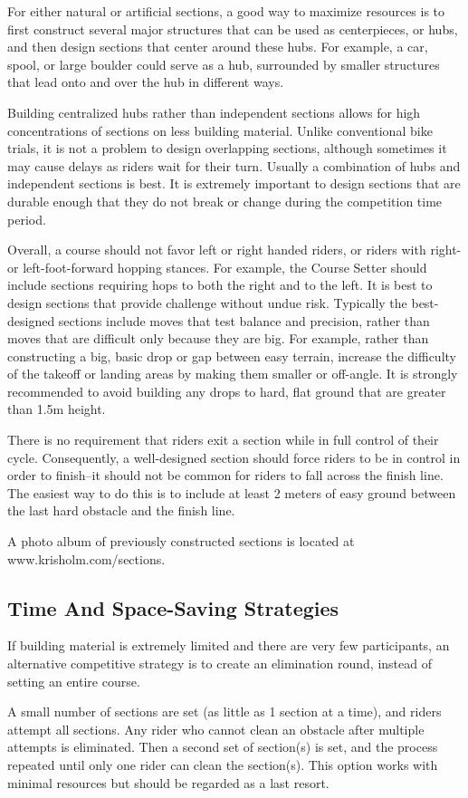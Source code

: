 For either natural or artificial sections, a good way to maximize resources is to first construct several major structures that can be used as centerpieces, or hubs, and then design sections that center around these hubs. 
For example, a car, spool, or large boulder could serve as a hub, surrounded by smaller structures that lead onto and over the hub in different ways.

Building centralized hubs rather than independent sections allows for high concentrations of sections on less building material.
Unlike conventional bike trials, it is not a problem to design overlapping sections, although sometimes it may cause delays as riders wait for their turn. 
Usually a combination of hubs and independent sections is best.
It is extremely important to design sections that are durable enough that they do not break or change during the competition time period.

Overall, a course should not favor left or right handed riders, or riders with right- or left-foot-forward hopping stances.
For example, the Course Setter should include sections requiring hops to both the right and to the left.
It is best to design sections that provide challenge without undue risk. 
Typically the best-designed sections include moves that test balance and precision, rather than moves that are difficult only because they are big. 
For example, rather than constructing a big, basic drop or gap between easy terrain, increase the difficulty of the takeoff or landing areas by making them smaller or off-angle. 
It is strongly recommended to avoid building any drops to hard, flat ground that are greater than 1.5m height.

There is no requirement that riders exit a section while in full control of their cycle. 
Consequently, a well-designed section should force riders to be in control in order to finish--it should not be common for riders to fall across the finish line. 
The easiest way to do this is to include at least 2 meters of easy ground between the last hard obstacle and the finish line.

A photo album of previously constructed sections is located at www.krisholm.com/sections.

\subsection{Time And Space-Saving Strategies}
If building material is extremely limited and there are very few participants, an alternative competitive strategy is to create an elimination round, instead of setting an entire course.

A small number of sections are set (as little as 1 section at a time), and riders attempt all sections. 
Any rider who cannot clean an obstacle after multiple attempts is eliminated. 
Then a second set of section(s) is set, and the process repeated until only one rider can clean the section(s). 
This option works with minimal resources but should be regarded as a last resort.
